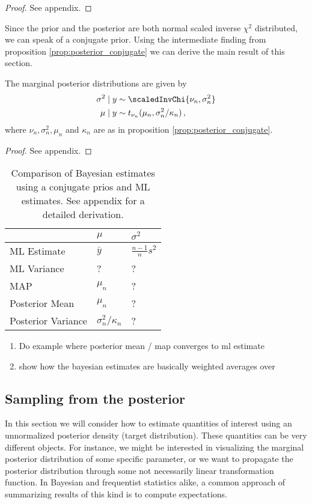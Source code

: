 \begin{proof}
  See appendix.
\end{proof}

Since the prior and the posterior are both normal scaled inverse $\chi^2$ distributed, we can speak of a conjugate prior.
Using the intermediate finding from proposition \ref{prop:posterior_conjugate} we can derive the main result of this section.

\begin{proposition}
  The marginal posterior distributions are given by
  \begin{align*}
    \sigma^2 \mid y &\sim \scaledInvChi{\nu_n, \sigma_n^2}\\
    \mu \mid y &\sim t_{\nu_n}(\mu_n, \sigma_n^2 / \kappa_n) \,,
  \end{align*}
  where $\nu_n, \sigma_n^2, \mu_n$ and $\kappa_n$ are as in proposition \ref{prop:posterior_conjugate}.
\end{proposition}

\begin{proof}
  See appendix.
\end{proof}

\begin{table}[ht!]
\centering
{\small
 \begin{tabular}{l l l}
 & $\mu$ & $\sigma^2$\\
 \hline
 ML Estimate & $\bar{y}$ & $\frac{n-1}{n}s^2$\\
 ML Variance & ? & ?\\
 MAP & $\mu_n$ & ?\\
 Posterior Mean & $\mu_n$ &?\\
 Posterior Variance & $\sigma_n^2 / \kappa_n$ &?
 \end{tabular}
 }
\caption{{\small Comparison of Bayesian estimates using a conjugate prios and ML estimates. See appendix for a detailed derivation.}}
\label{table:comp_conjugate_bay_ml}
\end{table}

\begin{enumerate}
  \item Do example where posterior mean / map converges to ml estimate
  \item show how the bayesian estimates are basically weighted averages over
\end{enumerate}

\subsection{Sampling from the posterior}
In this section we will consider how to estimate quantities of interest using
an unnormalized posterior density (target distribution).
These quantities can be very different objects.
For instance, we might be interested in visualizing the marginal posterior distribution
of some specific parameter, or we want to propagate the posterior distribution
through some not necessarily linear transformation function.
In Bayesian and frequentist statistics alike, a common approach of summarizing
results of this kind is to compute expectations.

